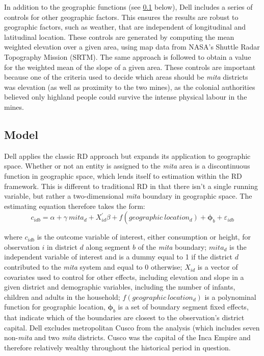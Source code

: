 \documentclass[12pt]{article}
\begin{document}
In addition to the geographic functions (see \ref{sec:model} below), Dell includes a series of controls for other geographic factors. This ensures the results are robust to geographic factors, such as weather, that are independent of longitudinal and latitudinal location. These controls are generated by computing the mean weighted elevation over a given area, using map data from NASA’s Shuttle Radar Topography Mission (SRTM). The same approach is followed to obtain a value for the weighted mean of the slope of a given area. These controls are important because one of the criteria used to decide which areas should be \emph{mita} districts was elevation (as well as proximity to the two mines), as the colonial authorities believed only highland people could survive the intense physical labour in the mines.

\subsection{Model}
\label{sec:model}

Dell applies the classic RD approach but expands its application to geographic space. Whether or not an entity is assigned to the \emph{mita} area is a discontinuous function in geographic space, which lends itself to estimation within the RD framework. This is different to traditional RD in that there isn't a single running variable, but rather a two-dimensional \emph{mita} boundary in geographic space. The estimating equation therefore takes the form:
    \begin{equation} \label{eq:1}
    c_{i d b}=\alpha+\gamma\ mita _d+X_{i d}^{\prime} \beta+f\left(\right.geographic\ location \left.{ }_d\right)+\boldsymbol{\phi}_b+\varepsilon_{i d b}
    \end{equation}

where $c_{idb}$ is the outcome variable of interest, either consumption or height, for observation $i$ in district $d$ along segment $b$ of the \emph{mita} boundary; $mita_d$ is the independent variable of interest and is a dummy equal to 1 if the district $d$ contributed to the \emph{mita} system and equal to 0 otherwise; $X_{id}$ is a vector of covariates used to control for other effects, including elevation and slope in a given district and demographic variables, including the number of infants, children and adults in the household; $f(geographic\ location_d)$ is a polynominal function for geographic location, $\boldsymbol{\phi}_b$ is a set of boundary segment fixed effects, that indicate which of the boundaries are closest to the observation's district capital. Dell excludes metropolitan Cusco from the analysis (which includes seven non-\emph{mita} and two \emph{mita} districts. Cusco was the capital of the Inca Empire and therefore relatively wealthy throughout the historical period in question.
\end{document}
